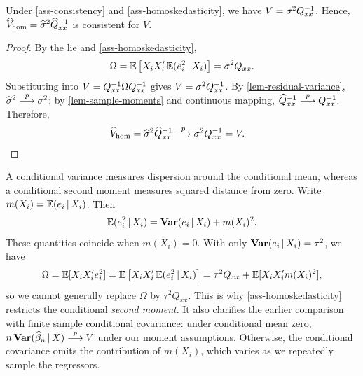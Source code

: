 \documentclass[a4paper,12pt]{article}
\begin{document}
\begin{lemma}
	Under \autoref{ass-consistency} and \autoref{ass-homoskedasticity}, we have $V = \sigma^2 Q_{xx}^{-1}$.
	Hence, $\widehat V_{\mathrm{hom}}=\widehat\sigma^2\widehat Q_{xx}^{-1}$ is consistent for $V$.
\end{lemma}
\begin{proof}
	By the \gls{lie} and \autoref{ass-homoskedasticity},
	\begin{align*}
		\Omega
		=\operatorname{\mathbb{E}}\big[X_iX_i^{\prime}\operatorname{\mathbb{E}}(e_i^2\mathpunct{}|\mathpunct{} X_i)\big]
		=\sigma^2Q_{xx}.
	\end{align*}
	Substituting into $V=Q_{xx}^{-1}\Omega Q_{xx}^{-1}$ gives $V=\sigma^2Q_{xx}^{-1}$.
	By \autoref{lem-residual-variance}, $\widehat\sigma^2\overset{p}{\longrightarrow}\sigma^2$;
	by \autoref{lem-sample-moments} and continuous mapping,
	$\widehat Q_{xx}^{-1}\overset{p}{\longrightarrow} Q_{xx}^{-1}$.
	Therefore,
	\begin{align*}
		\widehat V_{\mathrm{hom}}
		&=\widehat\sigma^2\widehat Q_{xx}^{-1}
		\overset{p}{\longrightarrow}\sigma^2Q_{xx}^{-1}=V.
		\qedhere
	\end{align*}
\end{proof}

\begin{remark}
	A conditional variance measures dispersion around the conditional mean,
	whereas a conditional second moment measures squared distance from zero.
	Write $m(X_i)=\operatorname{\mathbb{E}}(e_i\mathpunct{}|\mathpunct{} X_i)$. Then
	\begin{align*}
		\operatorname{\mathbb{E}}(e_i^2\mathpunct{}|\mathpunct{} X_i)
		=\operatorname{\text{\textrm{\upshape\textbf{Var}}}}(e_i\mathpunct{}|\mathpunct{} X_i)+m(X_i)^2.
	\end{align*}
	These quantities coincide when $m(X_i)=0$.
	With only $\operatorname{\text{\textrm{\upshape\textbf{Var}}}}(e_i\mathpunct{}|\mathpunct{} X_i)=\tau^2$, we have
	\begin{align*}
		\Omega
		=\operatorname{\mathbb{E}}[X_iX_i^{\prime} e_i^2]
		=\operatorname{\mathbb{E}}\big[X_iX_i^{\prime}\operatorname{\mathbb{E}}(e_i^2\mathpunct{}|\mathpunct{} X_i)\big]
		=\tau^2Q_{xx}+\operatorname{\mathbb{E}}[X_iX_i^{\prime} m(X_i)^2],
	\end{align*}
	so we cannot generally replace $\Omega$ by $\tau^2Q_{xx}$.
	This is why \autoref{ass-homoskedasticity} restricts the conditional \emph{second moment}.
	It also clarifies the earlier comparison with finite sample conditional covariance:
	under conditional mean zero, $n\operatorname{\text{\textrm{\upshape\textbf{Var}}}}(\widehat\beta_n\mathpunct{}|\mathpunct{} X)\overset{p}{\longrightarrow} V$ under our moment assumptions.
	Otherwise, the conditional covariance omits the contribution of $m(X_i)$,
	which varies as we repeatedly sample the regressors.
\end{remark}
\end{document}
